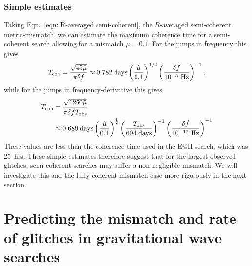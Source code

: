 \documentclass[../full_thesis/full_thesis.tex]{subfiles}
\begin{document}
\subsubsection{Simple estimates}
Taking Eqn.~\eqref{eqn: R-averaged semi-coherent}, the $R$-averaged semi-coherent
metric-mismatch,
we can estimate the maximum coherence time
for a semi-coherent search allowing for a mismatch $\mu=0.1$. For the jumps in
frequency this gives
\begin{align}
T_{\mathrm{coh}} = \frac{\sqrt{45\hat{\mu}}}{\pi\delta f}
\approx 0.782 \;\mathrm{ days}
\left(\frac{\hat{\mu}}{0.1}\right)^{1/2}
\left(\frac{\delta f}{10^{-5}\textrm{ Hz}}\right)^{-1},
\end{align}
while for the jumps in frequency-derivative this gives
\begin{align}
\begin{split}
T_{\mathrm{coh}} & = \frac{\sqrt{1260\hat{\mu}}}{\pi\delta\dot{f}T_{\mathrm{obs}}} \\
& \approx 0.689 \;\mathrm{ days}
\left(\frac{\hat{\mu}}{0.1}\right)^{\frac{1}{2}}
\left(\frac{T_{\mathrm{obs}}}{694 \textrm{ days}}\right)^{-1}
\left(\frac{\delta\dot{f}}{10^{-12}\textrm{ Hz}}\right)^{-1}
\end{split}
\end{align}
These values are less than the coherence time used in the E@H search, which
was 25~hrs. These simple estimates therefore suggest that for the largest
observed glitches, semi-coherent searches may suffer a non-negligible mismatch.
We will investigate this and the fully-coherent mismatch case more rigorously
in the next section.

\section{Predicting the mismatch and rate of glitches in gravitational wave searches}
\label{sec: estimating the mismatch}
\end{document}
